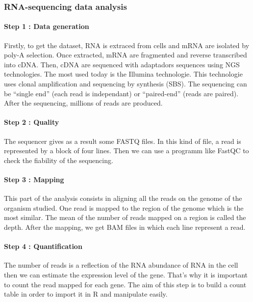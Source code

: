 \documentclass[]{article}
\let\oldparagraph\paragraph
\renewcommand{\paragraph}[1]{\oldparagraph{#1}\mbox{}}
\begin{document}
\subsubsection{RNA-sequencing data
analysis}\label{rna-sequencing-data-analysis}

\paragraph{Step 1 : Data generation}\label{step-1-data-generation}

Firstly, to get the dataset, RNA is extraced from cells and mRNA are
isolated by poly-A selection. Once extracted, mRNA are fragmented and
reverse transcribed into cDNA. Then, cDNA are sequenced with adaptadors
sequences using NGS technologies. The most used today is the Illumina
technologie. This technologie uses clonal amplification and sequencing
by synthesis (SBS). The sequencing can be ``single end'' (each read is
independant) or ``paired-end'' (reads are paired). After the sequencing,
millions of reads are produced.

\paragraph{Step 2 : Quality}\label{step-2-quality}

The sequencer gives as a result some FASTQ files. In this kind of file,
a read is represented by a block of four lines. Then we can use a
programm like FastQC to check the fiability of the sequencing.

\paragraph{Step 3 : Mapping}\label{step-3-mapping}

This part of the analysis consists in aligning all the reads on the
genome of the organism studied. One read is mapped to the region of the
genome which is the most similar. The mean of the number of reads mapped
on a region is called the depth. After the mapping, we get BAM files in
which each line represent a read.

\paragraph{Step 4 : Quantification}\label{step-4-quantification}

The number of reads is a reflection of the RNA abundance of RNA in the
cell then we can estimate the expression level of the gene. That's why
it is important to count the read mapped for each gene. The aim of this
step is to build a count table in order to import it in R and manipulate
easily.
\end{document}

